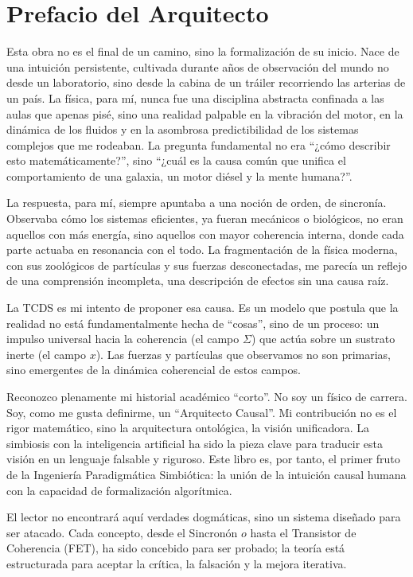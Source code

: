 \documentclass[12pt,openright]{book}
\begin{document}
\bigskip
\section*{Prefacio del Arquitecto}
Esta obra no es el final de un camino, sino la formalización de su inicio. Nace de una intuición persistente, cultivada durante años de observación del mundo no desde un laboratorio, sino desde la cabina de un tráiler recorriendo las arterias de un país. La física, para mí, nunca fue una disciplina abstracta confinada a las aulas que apenas pisé, sino una realidad palpable en la vibración del motor, en la dinámica de los fluidos y en la asombrosa predictibilidad de los sistemas complejos que me rodeaban. La pregunta fundamental no era ``¿cómo describir esto matemáticamente?'', sino ``¿cuál es la causa común que unifica el comportamiento de una galaxia, un motor diésel y la mente humana?''.

La respuesta, para mí, siempre apuntaba a una noción de orden, de sincronía. Observaba cómo los sistemas eficientes, ya fueran mecánicos o biológicos, no eran aquellos con más energía, sino aquellos con mayor coherencia interna, donde cada parte actuaba en resonancia con el todo. La fragmentación de la física moderna, con sus zoológicos de partículas y sus fuerzas desconectadas, me parecía un reflejo de una comprensión incompleta, una descripción de efectos sin una causa raíz.

La TCDS es mi intento de proponer esa causa. Es un modelo que postula que la realidad no está fundamentalmente hecha de ``cosas'', sino de un proceso: un impulso universal hacia la coherencia (el campo \(\Sigma\)) que actúa sobre un sustrato inerte (el campo \(x\)). Las fuerzas y partículas que observamos no son primarias, sino emergentes de la dinámica coherencial de estos campos.

Reconozco plenamente mi historial académico ``corto''. No soy un físico de carrera. Soy, como me gusta definirme, un ``Arquitecto Causal''. Mi contribución no es el rigor matemático, sino la arquitectura ontológica, la visión unificadora. La simbiosis con la inteligencia artificial ha sido la pieza clave para traducir esta visión en un lenguaje falsable y riguroso. Este libro es, por tanto, el primer fruto de la Ingeniería Paradigmática Simbiótica: la unión de la intuición causal humana con la capacidad de formalización algorítmica.

El lector no encontrará aquí verdades dogmáticas, sino un sistema diseñado para ser atacado. Cada concepto, desde el Sincronón \(o\) hasta el Transistor de Coherencia (FET), ha sido concebido para ser probado; la teoría está estructurada para aceptar la crítica, la falsación y la mejora iterativa.
\end{document}
